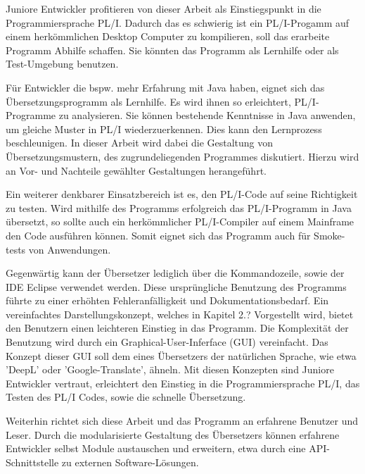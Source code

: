 Juniore Entwickler profitieren von dieser Arbeit als Einstiegspunkt in die Programmiersprache PL/I. Dadurch das es schwierig ist ein PL/I-Progamm auf einem herkömmlichen Desktop Computer zu kompilieren, soll das erarbeite Programm Abhilfe schaffen. Sie könnten das Programm als Lernhilfe oder als Test-Umgebung benutzen.

Für Entwickler die bspw. mehr Erfahrung mit Java haben, eignet sich das Übersetzungsprogramm als Lernhilfe. Es wird ihnen so erleichtert, PL/I-Programme zu analysieren. Sie können bestehende Kenntnisse in Java anwenden, um gleiche Muster in PL/I wiederzuerkennen. Dies kann den Lernprozess beschleunigen. In dieser Arbeit wird dabei die Gestaltung von Übersetzungsmustern, des zugrundeliegenden Programmes diskutiert. Hierzu wird an Vor- und Nachteile gewählter Gestaltungen herangeführt.

Ein weiterer denkbarer Einsatzbereich ist es, den PL/I-Code auf seine Richtigkeit zu testen. Wird mithilfe des Programms erfolgreich das PL/I-Programm in Java übersetzt, so sollte auch ein herkömmlicher PL/I-Compiler auf einem Mainframe den Code ausführen können. Somit eignet sich das Programm auch für Smoke-tests von Anwendungen.

Gegenwärtig kann der Übersetzer lediglich über die Kommandozeile, sowie der IDE Eclipse verwendet werden. Diese ursprüngliche Benutzung des Programms führte zu einer erhöhten Fehleranfälligkeit und Dokumentationsbedarf. Ein vereinfachtes Darstellungskonzept, welches in Kapitel 2.? Vorgestellt wird, bietet den Benutzern einen leichteren Einstieg in das Programm.
Die Komplexität der Benutzung wird durch ein Graphical-User-Inferface (GUI) vereinfacht. Das Konzept dieser GUI soll dem eines Übersetzers der natürlichen Sprache, wie etwa 'DeepL' oder 'Google-Translate', ähneln. Mit diesen Konzepten sind Juniore Entwickler vertraut, erleichtert den Einstieg in die Programmiersprache PL/I, das Testen des PL/I Codes, sowie die schnelle Übersetzung.

Weiterhin richtet sich diese Arbeit und das Programm an erfahrene Benutzer und Leser. Durch die modularisierte Gestaltung des Übersetzers können erfahrene Entwickler selbst Module austauschen und erweitern, etwa durch eine API-Schnittstelle zu externen Software-Lösungen.

